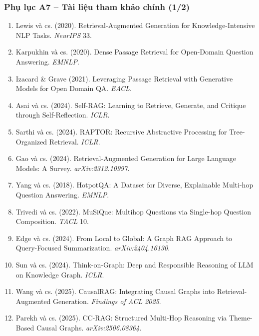 \begin{frame}
\frametitle{Phụ lục A7 -- Tài liệu tham khảo chính (1/2)}
\scriptsize
\begin{enumerate}\setlength{\itemsep}{1pt}
  \item Lewis và cs. (2020). Retrieval-Augmented Generation for Knowledge-Intensive NLP Tasks. \textit{NeurIPS} 33.
  \item Karpukhin và cs. (2020). Dense Passage Retrieval for Open-Domain Question Answering. \textit{EMNLP}.
  \item Izacard \& Grave (2021). Leveraging Passage Retrieval with Generative Models for Open Domain QA. \textit{EACL}.
  \item Asai và cs. (2024). Self-RAG: Learning to Retrieve, Generate, and Critique through Self-Reflection. \textit{ICLR}.
  \item Sarthi và cs. (2024). RAPTOR: Recursive Abstractive Processing for Tree-Organized Retrieval. \textit{ICLR}.
  \item Gao và cs. (2024). Retrieval-Augmented Generation for Large Language Models: A Survey. \textit{arXiv:2312.10997}.
  \item Yang và cs. (2018). HotpotQA: A Dataset for Diverse, Explainable Multi-hop Question Answering. \textit{EMNLP}.
  \item Trivedi và cs. (2022). MuSiQue: Multihop Questions via Single-hop Question Composition. \textit{TACL} 10.
  \item Edge và cs. (2024). From Local to Global: A Graph RAG Approach to Query-Focused Summarization. \textit{arXiv:2404.16130}.
  \item Sun và cs. (2024). Think-on-Graph: Deep and Responsible Reasoning of LLM on Knowledge Graph. \textit{ICLR}.
  \item Wang và cs. (2025). CausalRAG: Integrating Causal Graphs into Retrieval-Augmented Generation. \textit{Findings of ACL 2025}.
  \item Parekh và cs. (2025). CC-RAG: Structured Multi-Hop Reasoning via Theme-Based Causal Graphs. \textit{arXiv:2506.08364}.
\end{enumerate}
\end{frame}


